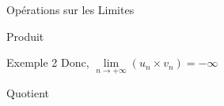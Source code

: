 \documentclass{coursbook}
\begin{document}
\begin{Gpartie}{Opérations sur les Limites}
\begin{Spartie}{Produit}
\begin{SSpartie}{Exemple 2}
                Donc, $\lim\limits_{n\to +\infty}(u_n\times v_n)=-\infty$
            \end{SSpartie}
        \end{Spartie}\pagebreak
        \begin{Spartie}{Quotient}
            \begin{table}[H]%
                \centering {}
\end{table}
\end{Spartie}
\end{Gpartie}
\end{document}
